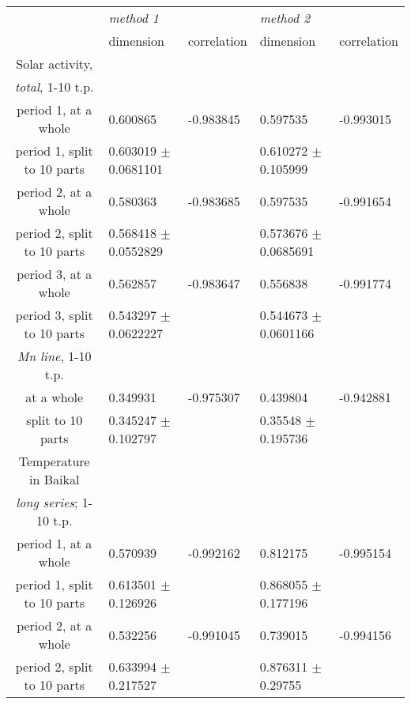 \documentclass[a4paper]{article}
\begin{document}
\begin{tabular}{cllll}
\hline
                               & \textit{method 1}        &             & \textit{method 2}        &             \\
                               & dimension                & correlation & dimension                & correlation \\
\hline 
Solar activity,\\
\textit{total}, 1-10 t.p.\\
period 1, at a whole           & 0.600865                 & -0.983845   & 0.597535                 & -0.993015   \\
period 1, split to 10 parts    & 0.603019 $\pm$ 0.0681101 &             & 0.610272 $\pm$ 0.105999  &             \\
period 2, at a whole           & 0.580363                 & -0.983685   & 0.597535                 & -0.991654   \\
period 2, split to 10 parts    & 0.568418 $\pm$ 0.0552829 &             & 0.573676 $\pm$ 0.0685691 &             \\
period 3, at a whole           & 0.562857                 & -0.983647   & 0.556838                 & -0.991774   \\
period 3, split to 10 parts    & 0.543297 $\pm$ 0.0622227 &             & 0.544673 $\pm$ 0.0601166 &             \\
\textit{Mn line}, 1-10 t.p.\\
at a whole                     & 0.349931                 & -0.975307   & 0.439804                 & -0.942881   \\
split to 10 parts              & 0.345247 $\pm$ 0.102797  &             & 0.35548 $\pm$ 0.195736   &             \\
\hline
Temperature in Baikal\\
\textit{long series}; 1-10 t.p.\\
period 1, at a whole           & 0.570939                 & -0.992162   & 0.812175                 & -0.995154   \\
period 1, split to 10 parts    & 0.613501 $\pm$ 0.126926  &             & 0.868055 $\pm$ 0.177196  &             \\
period 2, at a whole           & 0.532256                 & -0.991045   & 0.739015                 & -0.994156   \\
period 2, split to 10 parts    & 0.633994 $\pm$ 0.217527  &             & 0.876311 $\pm$ 0.29755   &             \\

\end{tabular}
\end{document}
